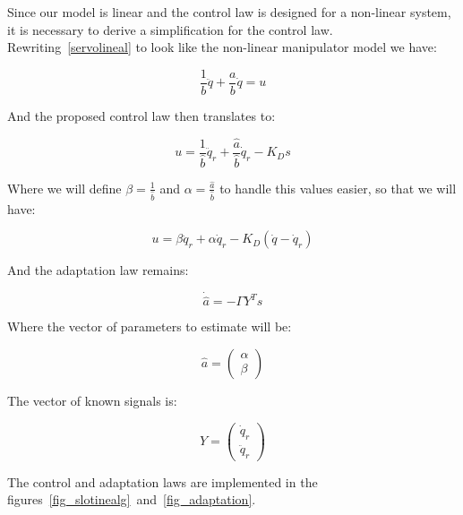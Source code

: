 \documentclass[journal]{IEEEtran}
\begin{document}
    Since our model is linear and the control law is designed for a non-linear system, it is necessary to derive a simplification for the control law. Rewriting~\ref{servolineal} to look like the non-linear manipulator model we have:

    \begin{equation}
        \frac{1}{b} \ddot{q} + \frac{a}{b} \dot{q} = u
    \end{equation}

    And the proposed control law then translates to:

    \begin{equation*}
        u = \frac{1}{\hat{b}} \ddot{q}_r + \frac{\hat{a}}{\hat{b}} \dot{q}_r - K_D s
    \end{equation*}

    Where we will define $\beta = \frac{1}{\hat{b}}$ and $\alpha = \frac{\hat{a}}{\hat{b}}$ to handle this values easier, so that we will have:

    \begin{equation}
        u = \beta \ddot{q}_r + \alpha \dot{q}_r - K_D \left( \dot{q} - \dot{q}_r \right)
    \end{equation}

    And the adaptation law remains:

    \begin{equation*}
        \dot{\hat{a}} = - \Gamma Y^T s
    \end{equation*}

    Where the vector of parameters to estimate will be:

    \begin{equation}
        \hat{a} =
        \begin{pmatrix}
            \alpha \\
            \beta
        \end{pmatrix}
    \end{equation}

    The vector of known signals is:

    \begin{equation}
        Y =
        \begin{pmatrix}
            \dot{q}_r \\
            \ddot{q}_r
        \end{pmatrix}
    \end{equation}

    The control and adaptation laws are implemented in the figures~\ref{fig_slotinealg}~and~\ref{fig_adaptation}.
\end{document}
